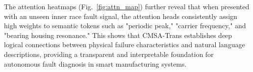 The attention heatmaps (Fig.~\ref{fig:attn_map}) further reveal that when presented with an unseen inner race fault signal, the attention heads consistently assign high weights to semantic tokens such as "periodic peak," "carrier frequency," and "bearing housing resonance." This shows that CMSA-Trans establishes deep logical connections between physical failure characteristics and natural language descriptions, providing a transparent and interpretable foundation for autonomous fault diagnosis in smart manufacturing systems.

